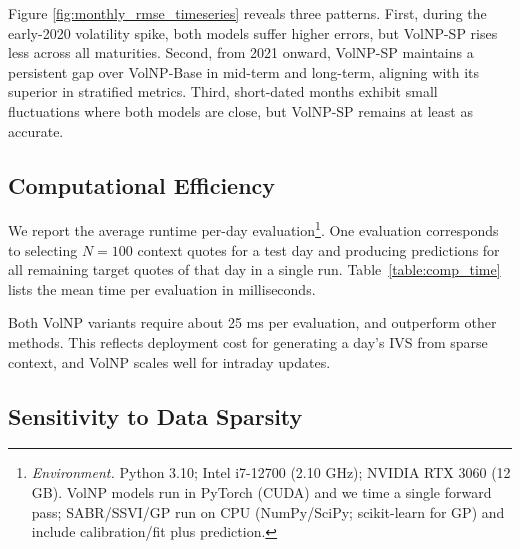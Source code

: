 \documentclass[authoryear,preprint,review,12pt]{elsarticle}
\begin{document}
Figure \ref{fig:monthly_rmse_timeseries} reveals three patterns. First, during the early-2020 volatility spike, both models suffer higher errors, but VolNP-SP rises less across all maturities. Second, from 2021 onward, VolNP-SP maintains a persistent gap over VolNP-Base in mid-term and long-term, aligning with its superior in stratified metrics. Third, short-dated months exhibit small fluctuations where both models are close, but VolNP-SP remains at least as accurate.

\subsection{Computational Efficiency}
\label{sec:compute}
We report the average runtime per-day evaluation\footnote{\textit{Environment.} Python 3.10; Intel i7-12700 (2.10 GHz); NVIDIA RTX 3060 (12 GB). VolNP models run in PyTorch (CUDA) and we time a single forward pass; SABR/SSVI/GP run on CPU (NumPy/SciPy; scikit-learn for GP) and include calibration/fit plus prediction.}. One evaluation corresponds to selecting \(N=100\) context quotes for a test day and producing predictions for all remaining target quotes of that day in a single run. Table~\ref{table:comp_time} lists the mean time per evaluation in milliseconds.



\begin{table}[ht]
\centering
\caption{Average per-day evaluation runtime (milliseconds).}
\label{table:comp_time}
\end{table}

Both VolNP variants require about 25 ms per evaluation, and outperform other methods. This reflects deployment cost for generating a day's IVS from sparse context, and VolNP scales well for intraday updates.






\subsection{Sensitivity to Data Sparsity}
\label{sec:sensitivity}
\end{document}
